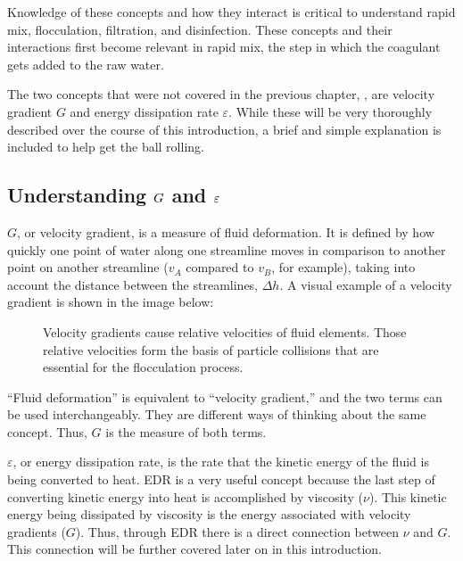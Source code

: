 \documentclass[letterpaper,10pt,english]{sphinxmanual}
\let\sphinxpxdimen\pdfpxdimen\else\newdimen\sphinxpxdimen
\begin{document}
Knowledge of these concepts and how they interact is critical to understand rapid mix, flocculation, filtration, and disinfection. These concepts and their interactions first become relevant in rapid mix, the step in which the coagulant gets added to the raw water.

The two concepts that were not covered in the previous chapter, {\hyperref[\detokenize{Review/Review_Fluid_Mechanics:title-review-fluid-mechanics}]{}}, are velocity gradient \(G\) and energy dissipation rate \(\varepsilon\). While these will be very thoroughly described over the course of this introduction, a brief and simple explanation is included to help get the ball rolling.


\subsection{Understanding \protect\(G\protect\) and \protect\(\varepsilon\protect\)}
\label{\detokenize{Rapid_Mix/RM_Intro:understanding-and}}
\(G\), or velocity gradient, is a measure of fluid deformation. It is defined by how quickly one point of water along one streamline moves in comparison to another point on another streamline (\(v_A\) compared to \(v_B\), for example), taking into account the distance between the streamlines, \(\Delta h\). A visual example of a velocity gradient is shown in the image below:

\begin{figure}[htbp]
\centering
\capstart

\noindent\sphinxincludegraphics[width=700\sphinxpxdimen]{{Velocity_gradient_image}.jpg}
\caption{Velocity gradients cause relative velocities of fluid elements. Those relative velocities form the basis of particle collisions that are essential for the flocculation process.}\label{\detokenize{Rapid_Mix/RM_Intro:id11}}\label{\detokenize{Rapid_Mix/RM_Intro:figure-velocity-gradient-image}}\end{figure}

 “Fluid deformation” is equivalent to “velocity gradient,” and the two terms can be used interchangeably. They are different ways of thinking about the same concept. Thus, \(G\) is the measure of both terms.

\(\varepsilon\), or energy dissipation rate, is the rate that the kinetic energy of the fluid is being converted to heat. EDR is a very useful concept because the last step of converting kinetic energy into heat is accomplished by viscosity (\(\nu\)). This kinetic energy being dissipated by viscosity is the energy associated with velocity gradients (\(G\)). Thus, through EDR there is a direct connection between \(\nu\) and \(G\). This connection will be further covered later on in this introduction.
\end{document}
